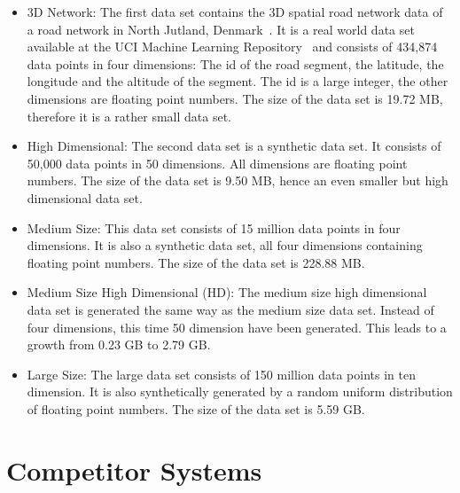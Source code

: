 \begin{itemize} 
\item 3D Network: The first data set contains the 3D spatial road network data of a road network in North Jutland, Denmark~\parencite{3dnet}. It is a real world data set available at the UCI Machine Learning Repository~\parencite{frank2010uci} and consists of 434,874 data points in four dimensions: The id of the road segment, the latitude, the longitude and the altitude of the segment. The id is a large integer, the other dimensions are floating point numbers. The size of the data set is 19.72 MB, therefore it is a rather small data set.

\item High Dimensional: The second data set is a synthetic data set. It consists of 50,000 data points in 50 dimensions. All dimensions are floating point numbers. The size of the data set is 9.50 MB, hence an even smaller but high dimensional data set.

\item Medium Size: This data set consists of 15 million data points in four dimensions. It is also a synthetic data set, all four dimensions containing floating point numbers. The size of the data set is 228.88 MB.

\item Medium Size High Dimensional (HD): The medium size high dimensional data set is generated the same way as the medium size data set. Instead of four dimensions, this time 50 dimension have been generated. This leads to a growth from 0.23 GB to 2.79 GB.  

\item Large Size: The large data set consists of 150 million data points in ten dimension. It is also synthetically generated by a random uniform distribution of floating point numbers. The size of the data set is 5.59 GB.
\end{itemize} 



\section{Competitor Systems}


